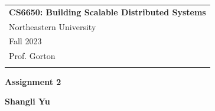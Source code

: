 \documentclass[a4paper,12pt]{article} %
\begin{document}



\thispagestyle{empty} %

\begin{tabular}{p{15.5cm}} %
{\large \bf CS6650: Building Scalable Distributed Systems} \\
Northeastern University \\ Fall 2023  \\ Prof. Gorton\\
\hline %
\\
\end{tabular} %

\vspace*{0.3cm} %

\begin{center} %
	{\Large \bf Assignment 2} %
	\vspace{2mm}
	
	{\bf Shangli Yu} %
		
\end{center}  

\vspace{0.4cm}


\end{document}
